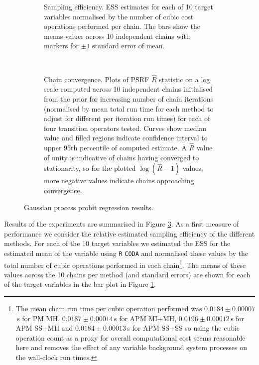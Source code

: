 \begin{figure}[!t]
\centering
\begin{subfigure}[b]{\linewidth}
\centering
{}
\caption{Sampling efficiency. \ac{ESS} estimates for each of 10 target variables normalised by the number of cubic cost operations performed per chain. The bars show the means values across 10 independent chains with markers for $\pm 1$ standard error of mean.}
\label{sfig:gaussian-process-probit-regressions-pm-ess-plot}
\end{subfigure}
\\[3mm]
\begin{subfigure}[b]{\linewidth}
\centering
{}
\caption{Chain convergence. Plots of \acs{PSRF} $\hat{R}$ statistic on a log scale computed across 10 independent chains initialised from the prior for increasing number of chain iterations (normalised by mean total run time for each method to adjust for different per iteration run times) for each of four transition operators tested. Curves show median value and filled regions indicate confidence interval to upper 95th percentile of computed estimate. A $\hat{R}$ value of unity is indicative of chains having converged to stationarity, so for the plotted $\log(\hat{R} - 1)$ values, more negative values indicate chains approaching convergence.}
\label{sfig:gaussian-process-probit-regressions-pm-prsf-plot}
\end{subfigure}
\caption[Gaussian process probit regression results.]{Gaussian process probit regression results.}
\label{fig:pm-gp-probit-regression-results}
\end{figure}

Results of the experiments are summarised in Figure \ref{fig:pm-gp-probit-regression-results}. As a first measure of performance we consider the relative estimated sampling efficiency of the different methods. For each of the 10 target variables we estimated the \ac{ESS} for the estimated mean of the variable using \texttt{R} \texttt{CODA} \citep{plummer2006coda} and normalised these values by the total number of cubic operations performed in each chain\footnote{The mean chain run time per cubic operation performed was $0.0184 \pm 0.00007$\,s for \ac{PM} \ac{MH}, $0.0187 \pm 0.00014$\,s for \ac{APM} \ac{MI}+\ac{MH}, $0.0196 \pm 0.00012$\,s for \ac{APM} \ac{SS}+\ac{MH} and $0.0184 \pm 0.00013$\,s for \ac{APM} \ac{SS}+\ac{SS} so using the cubic operation count as a proxy for overall computational cost seems reasonable here and removes the effect of any variable background system processes on the wall-clock run times.}. The means of these values across the 10 chains per method (and standard errors) are shown for each of the target variables in the bar plot in Figure \ref{sfig:gaussian-process-probit-regressions-pm-ess-plot}.

